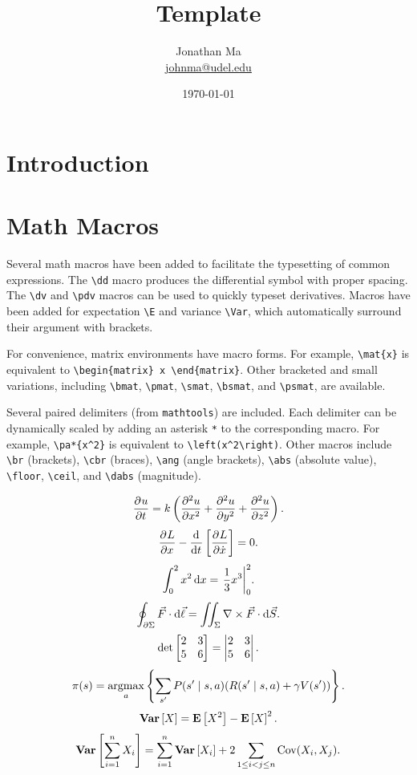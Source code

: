 \documentclass[11pt]{article}
\title{Template}
\author{Jonathan Ma\\
\href{mailto:johnma@udel.edu}{johnma@udel.edu}}
\date{\today}
\begin{document}
\maketitle

\section{Introduction}
\label{sec:intro}

\section{Math Macros}
Several math macros have been added to facilitate the typesetting of common expressions. The \verb|\dd| macro produces the differential symbol with proper spacing. The \verb|\dv| and \verb|\pdv| macros can be used to quickly typeset derivatives. Macros have been added for expectation \verb|\E| and variance \verb|\Var|, which automatically surround their argument with brackets.

For convenience, matrix environments have macro forms. For example, \verb|\mat{x}| is equivalent to \verb|\begin{matrix} x \end{matrix}|. Other bracketed and small variations, including \verb|\bmat|, \verb|\pmat|, \verb|\smat|, \verb|\bsmat|, and \verb|\psmat|, are available.

Several paired delimiters (from \verb|mathtools|) are included. Each delimiter can be dynamically scaled by adding an asterisk \verb|*| to the corresponding macro. For example, \verb|\pa*{x^2}| is equivalent to \verb|\left(x^2\right)|. Other macros include \verb|\br| (brackets), \verb|\cbr| (braces), \verb|\ang| (angle brackets), \verb|\abs| (absolute value), \verb|\floor|, \verb|\ceil|, and \verb|\dabs| (magnitude).

\[ \pdv ut = k\pa{\pdv[2] ux + \pdv[2] uy + \pdv[2] uz}. \]
\[ \pdv{L}{x} - \dv{}{t}\br{\pdv{L}{\dot x}} = 0. \]
\[ \int_0^2 x^2 \dd x = \eval*{\frac 13 x^3}_0^2. \]
\[ \oint_{\p\Sigma} \vec F \cdot \dd \vec\ell = \iint_{\Sigma} \del \times \vec F \cdot \dd \vec S. \]
\[ \det \bmat{2 & 3 \\ 5 & 6} = \abs{\mat{2 & 3 \\ 5 & 6}}. \]
\[ \pi(s) = \argmax_a \cbr{\sum_{s'} P(s' \mid s, a) (R(s' \mid s, a) + \gamma V(s'))}. \]
\[ \Var{X} = \E{X^2} - \E{X}^2. \]
\[ \Var{\sum_{i=1}^n X_i} = \sum_{i=1}^n \Var{X_i} + 2\sum_{1 \leq i < j \leq n} \on{Cov}(X_i, X_j). \]
\end{document}
